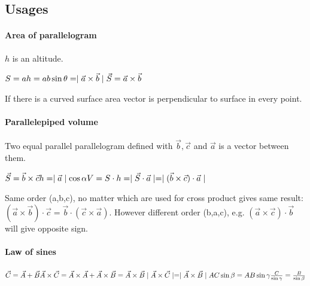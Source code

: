 \subsection{Usages}

\paragraph{Area of parallelogram}
\begin{center}	
	
\end{center}
$h$ is an altitude.

$S  = ah = ab \sin \theta = \mid \vec{a} \times \vec{b} \mid\\
\vec{S} = \vec{a} \times \vec{b}$

If there is a curved surface area vector is perpendicular to surface in every point.
\paragraph{Parallelepiped volume}
\begin{center}	
	
\end{center}
Two equal parallel parallelogram defined with $\vec{b}, \vec{c}$ and $\vec{a}$ is a vector between them.

$\vec{S} = \vec{b} \times \vec{c}\\
h = \mid \vec{a} \mid \cos \alpha\\
V = S \cdot h = \mid \vec{S} \cdot \vec{a} \mid = \mid (\vec{b} \times \vec{c}) \cdot \vec{a} \mid$

Same order (a,b,c), no matter which are used for cross product gives same result: $(\vec{a}\times \vec{b}) \cdot \vec{c} = \vec {b} \cdot (\vec{c} \times \vec{a})$. However different order (b,a,c), e.g. $(\vec{a}\times \vec{c}) \cdot \vec{b}$ will give opposite sign.

\paragraph{Law of sines}

$\vec{C} = \vec{A} + \vec{B}\\
\vec{A} \times \vec{C} = \vec{A} \times \vec{A}+ \vec{A} \times \vec{B} = \vec{A} \times \vec{B}\\
\mid \vec{A} \times \vec{C} \mid = \mid \vec{A} \times \vec{B}\mid\\
AC\sin \beta = AB\sin \gamma\\
\frac{C}{\sin \gamma} = \frac{B}{\sin \beta}$

